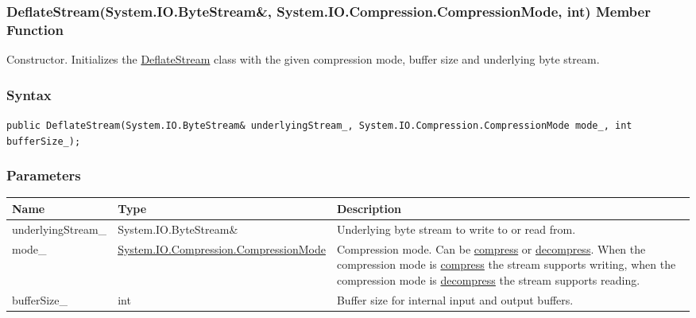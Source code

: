 \documentclass[a4paper,oneside,11.000000pt]{book}
\begin{document}
\hypertarget{System.IO.Compression.DeflateStream.constructor.P.System.IO.Compression.DeflateStream.R.System.IO.ByteStream.System.IO.Compression.CompressionMode.int}{\subsubsection*{DeflateStream(System.IO.ByteStream\&, System.IO.Compression.CompressionMode, int) Member Function}}
\begin{flushleft}
Constructor. Initializes the \hyperlink{System.IO.Compression.DeflateStream}{DeflateStream} class with the given compression mode, buffer size and underlying byte stream.

\end{flushleft}
\subsubsection*{Syntax}
\texttt{public DeflateStream(System.IO.ByteStream\& underlyingStream\_, System.IO.Compression.CompressionMode mode\_, int bufferSize\_);}
\subsubsection*{Parameters}
\begin{flushleft}
\begin{supertabular}[l]{!{\raggedright}p{4.10323cm}!{\raggedright}p{5.76344cm}!{\raggedright}p{4.93333cm}}
\textbf{Name}
& \textbf{Type}
& \textbf{Description}
\\
\hline
underlyingStream\_
& System.\-IO.\-ByteStream\&\-
& Underlying byte stream to write to or read from.

\\
mode\_
& \hyperlink{System.IO.Compression.CompressionMode}{System.\-IO.\-Compression.\-CompressionMode}
& Compression mode. Can be \hyperlink{System.IO.Compression.CompressionMode.compress}{compress} or \hyperlink{System.IO.Compression.CompressionMode.decompress}{decompress}.
When the compression mode is \hyperlink{System.IO.Compression.CompressionMode.compress}{compress} the stream supports writing,
when the compression mode is \hyperlink{System.IO.Compression.CompressionMode.decompress}{decompress} the stream supports reading.

\\
bufferSize\_
& int
& Buffer size for internal input and output buffers.

\\
\end{supertabular}

\end{flushleft}
\end{document}
